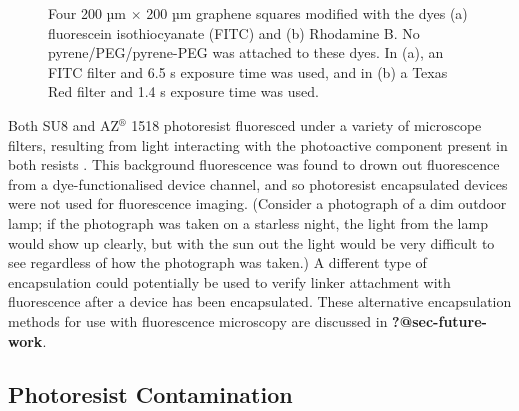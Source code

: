 \documentclass[
  a4paper,
]{scrbook}
\begin{document}
\begin{figure}
\begin{minipage}[t]{0.47\linewidth}
{{}

}

\subcaption{\label{fig-rhodamine}}
\end{minipage}%

\caption{\label{fig-FITC-rhodamine-B}Four 200 µm \(\times\) 200 µm
graphene squares modified with the dyes (a) fluorescein isothiocyanate
(FITC) and (b) Rhodamine B. No pyrene/PEG/pyrene-PEG was attached to
these dyes. In (a), an FITC filter and 6.5 s exposure time was used, and
in (b) a Texas Red filter and 1.4 s exposure time was used.}

\end{figure}

Both SU8 and AZ\(^\circledR\) 1518 photoresist fluoresced under a
variety of microscope filters, resulting from light interacting with the
photoactive component present in both resists \autocite{Pai2007}. This
background fluorescence was found to drown out fluorescence from a
dye-functionalised device channel, and so photoresist encapsulated
devices were not used for fluorescence imaging. (Consider a photograph
of a dim outdoor lamp; if the photograph was taken on a starless night,
the light from the lamp would show up clearly, but with the sun out the
light would be very difficult to see regardless of how the photograph
was taken.) A different type of encapsulation could potentially be used
to verify linker attachment with fluorescence after a device has been
encapsulated. These alternative encapsulation methods for use with
fluorescence microscopy are discussed in \textbf{?@sec-future-work}.

\hypertarget{sec-photoresist-contamination}{%
\subsection{Photoresist
Contamination}\label{sec-photoresist-contamination}}
\end{document}
